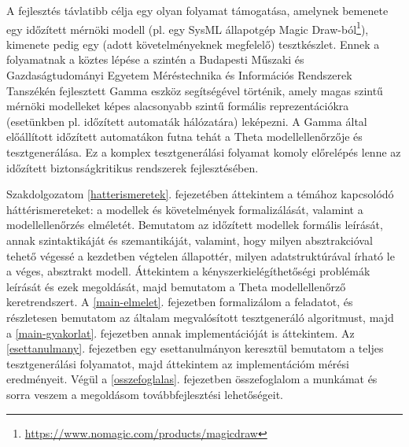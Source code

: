 A fejlesztés távlatibb célja egy olyan folyamat támogatása, amelynek bemenete egy időzített mérnöki modell (pl. egy SysML állapotgép Magic Draw-ból\footnote{\url{https://www.nomagic.com/products/magicdraw}}), kimenete pedig egy (adott követelményeknek megfelelő) tesztkészlet. Ennek a folyamatnak a köztes lépése a szintén a Budapesti Műszaki és Gazdaságtudományi Egyetem Méréstechnika és Információs Rendszerek Tanszékén fejlesztett Gamma \cite{Gamma} eszköz segítségével történik, amely magas szintű mérnöki modelleket képes alacsonyabb szintű formális reprezentációkra (esetünkben pl. időzített automaták hálózatára) leképezni. A Gamma által előállított időzített automatákon futna tehát a Theta modellellenőrzője és tesztgenerálása. Ez a komplex tesztgenerálási folyamat komoly előrelépés lenne az időzített biztonságkritikus rendszerek fejlesztésében.

Szakdolgozatom \ref{hatterismeretek}. fejezetében áttekintem a témához kapcsolódó háttérismereteket: a modellek és követelmények formalizálását, valamint a modellellenőrzés elméletét. Bemutatom az időzített modellek formális leírását, annak szintaktikáját és szemantikáját, valamint, hogy milyen absztrakcióval tehető végessé a kezdetben végtelen állapottér, milyen adatstruktúrával írható le a véges, absztrakt modell. Áttekintem a kényszerkielégíthetőségi problémák leírását és ezek megoldását, majd bemutatom a Theta modellellenőrző keretrendszert. A \ref{main-elmelet}. fejezetben formalizálom a feladatot, és részletesen bemutatom az általam megvalósított tesztgeneráló algoritmust, majd a \ref{main-gyakorlat}. fejezetben annak implementációját is áttekintem. Az \ref{esettanulmany}. fejezetben egy esettanulmányon keresztül bemutatom a teljes tesztgenerálási folyamatot, majd áttekintem az implementációm mérési eredményeit. Végül a \ref{osszefoglalas}. fejezetben összefoglalom a munkámat és sorra veszem a megoldásom továbbfejlesztési lehetőségeit.